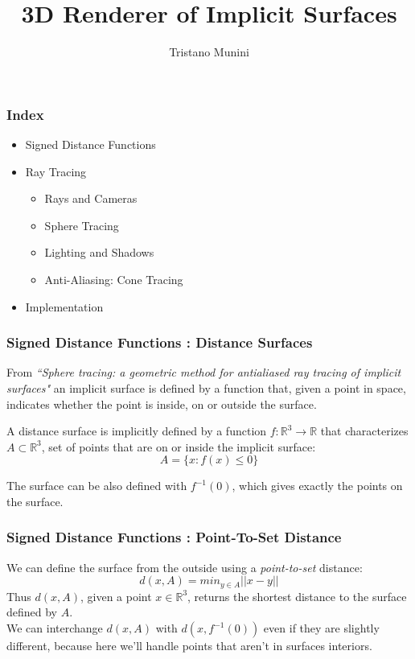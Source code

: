 \documentclass{beamer}
\title{3D Renderer of Implicit Surfaces}
\author{Tristano Munini}
\newcommand{\norm}[1]{\lvert\lvert #1 \lvert\lvert}
\newcommand\R{\ensuremath{\mathbb{R}}}
\begin{document}
{
  \frame{\titlepage}
}

\begin{frame}
\frametitle{Index}
\begin{itemize}
  \item Signed Distance Functions
  \item Ray Tracing
    \begin{itemize}
      \item Rays and Cameras
      \item Sphere Tracing
      \item Lighting and Shadows
      \item Anti-Aliasing: Cone Tracing
    \end{itemize}
  \item Implementation
\end{itemize}
\end{frame}

\begin{frame}
\frametitle{Signed Distance Functions : Distance Surfaces}
From \emph{``Sphere tracing: a geometric method for antialiased ray tracing of implicit surfaces"} an implicit surface is defined by a function that, given a point in space, indicates whether the point is inside, on or outside the surface.

\begin{definition}
A distance surface is implicitly defined by a function 
$f : \R^3 \to \R$ that characterizes $A \subset \R^3$, set of points that are on or inside the implicit surface:
$$ A = \{ x: f(x) \leq 0\} $$
\end{definition}

The surface can be also defined with $f^{-1}(0)$, which gives exactly the points on the surface.
\end{frame}

\begin{frame}
\frametitle{Signed Distance Functions : Point-To-Set Distance}
We can define the surface from the outside using a \emph{point-to-set} distance:
$$
d(x,A) = min_{y \in A} \norm{x - y}
$$
Thus $d(x,A)$, given a point $x \in \R^3$, returns the shortest distance to the surface defined by $A$.
\\
We can interchange $d(x,A)$ with $d(x, f^{-1}(0))$ even if they are slightly different, because here we'll handle points that aren't in surfaces interiors.
\end{frame}
\end{document}
